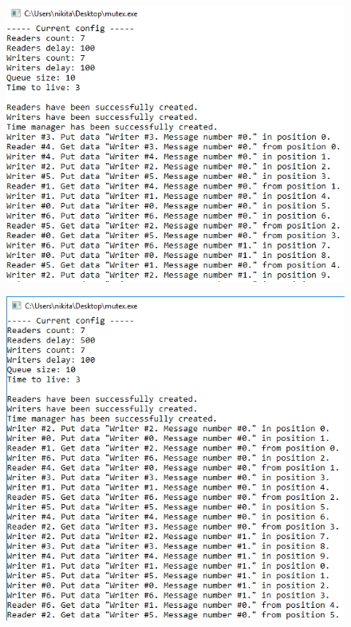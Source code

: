 \documentclass[14pt,a4paper,report]{report}
\begin{document}
\begin{figure}[h!]
	\centering
	\includegraphics[scale = 0.75]{images/p1_2_1.png}
	
	\caption{}
	\label{image:3}
\end{figure}

\begin{figure}[h!]
	\centering
	\includegraphics[scale = 0.75]{images/p1_2_2.png}
	
	\caption{}
	\label{image:4}
\end{figure}
\end{document}
